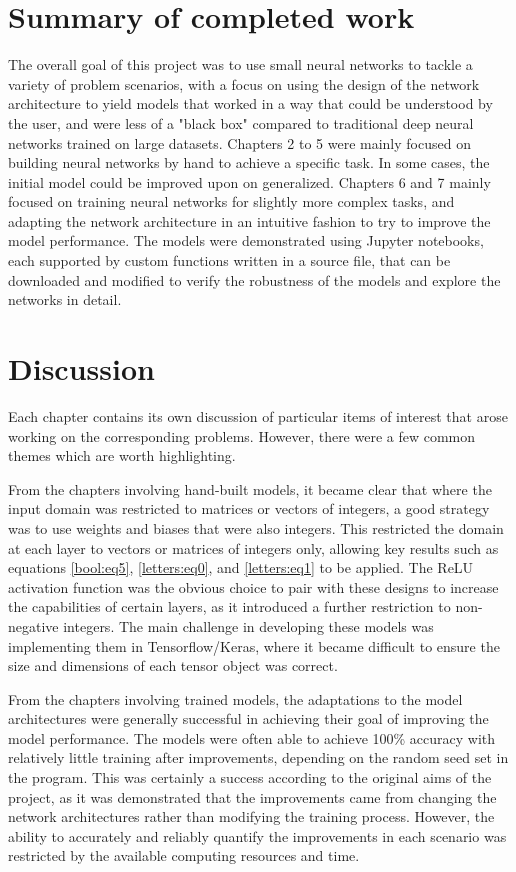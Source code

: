 \documentclass{somasmsc}
\begin{document}
\section{Summary of completed work}

The overall goal of this project was to use small neural networks to tackle a variety of problem scenarios, with a focus on using the design of the network architecture to yield models that worked in a way that could be understood by the user, and were less of a "black box" compared to traditional deep neural networks trained on large datasets. Chapters 2 to 5 were mainly focused on building neural networks by hand to achieve a specific task. In some cases, the initial model could be improved upon on generalized. Chapters 6 and 7 mainly focused on training neural networks for slightly more complex tasks, and adapting the network architecture in an intuitive fashion to try to improve the model performance. The models were demonstrated using Jupyter notebooks, each supported by custom functions written in a source file, that can be downloaded and modified to verify the robustness of the models and explore the networks in detail.

\section{Discussion}

Each chapter contains its own discussion of particular items of interest that arose working on the corresponding problems. However, there were a few common themes which are worth highlighting.

From the chapters involving hand-built models, it became clear that where the input domain was restricted to matrices or vectors of integers, a good strategy was to use weights and biases that were also integers. This restricted the domain at each layer to vectors or matrices of integers only, allowing key results such as equations \ref{bool:eq5}, \ref{letters:eq0}, and \ref{letters:eq1} to be applied. The ReLU activation function was the obvious choice to pair with these designs to increase the capabilities of certain layers, as it introduced a further restriction to non-negative integers. The main challenge in developing these models was implementing them in Tensorflow/Keras, where it became difficult to ensure the size and dimensions of each tensor object was correct.

From the chapters involving trained models, the adaptations to the model architectures were generally successful in achieving their goal of improving the model performance. The models were often able to achieve 100\% accuracy with relatively little training after improvements, depending on the random seed set in the program. This was certainly a success according to the original aims of the project, as it was demonstrated that the improvements came from changing the network architectures rather than modifying the training process. However, the ability to accurately and reliably quantify the improvements in each scenario was restricted by the available computing resources and time.
\end{document}
